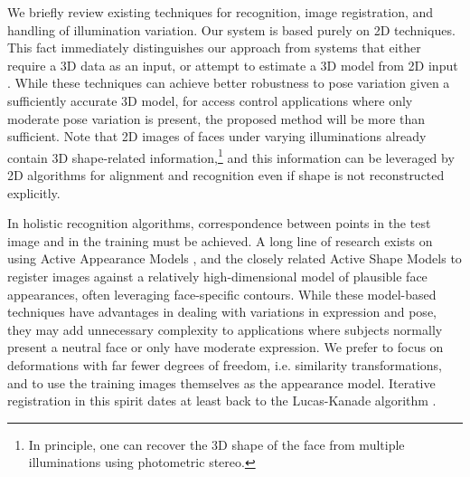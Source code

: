 \documentclass[10pt,journal,letterpaper,compsoc]{IEEEtran} %
\begin{document}
We briefly review existing techniques for recognition, image registration, and
handling of illumination variation.  Our system is based purely on 2D
techniques.  This fact immediately distinguishes our approach from systems
that either require a 3D data as an input, or attempt to estimate a 3D model
from 2D input \cite{amberg2007reconstructing,Blanz2003-PAMI}.  While these
techniques can achieve better robustness to pose variation given
a sufficiently accurate 3D model, for access control applications where only
moderate pose variation is present, the proposed method will be more
than sufficient.   Note that 2D images of faces
under varying illuminations already contain 3D shape-related information,\footnote{In principle,
one can recover the 3D shape of the face from multiple illuminations using photometric stereo.}
and this information can be leveraged by 2D algorithms for alignment and recognition
even if shape is not reconstructed explicitly.

In holistic recognition algorithms, correspondence between points in the test
image and in the training must be achieved.  A long line of research exists on
using Active Appearance Models \cite{Cootes2001-PAMI}, and the closely related
Active Shape Models \cite{cootes1992active} to register images against a
relatively high-dimensional model of plausible face appearances, often
leveraging face-specific contours.  While these model-based techniques have
advantages in dealing with variations in expression and pose, they may add
unnecessary complexity to applications where subjects normally present a neutral face
or only have moderate expression. We prefer to focus on deformations with far fewer
degrees of freedom, i.e. similarity transformations, and to use the training images themselves
as the appearance model. Iterative registration in this spirit dates at least back to the
Lucas-Kanade algorithm \cite{lucas1981iterative}.
\end{document}
